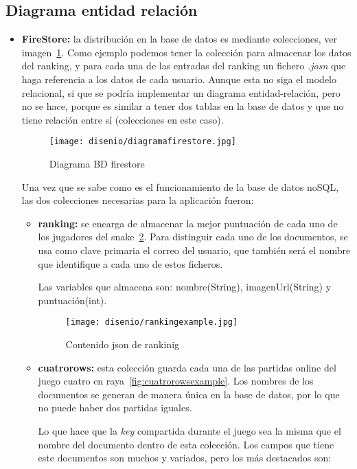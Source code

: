 \subsection{Diagrama entidad relación}
\begin{itemize}
	\item \textbf{FireStore:} la distribución en la base de datos es mediante colecciones, ver imagen~\ref{fig:diagramfirestore}. Como ejemplo podemos tener la colección para almacenar los datos del ranking, y para cada una de las entradas del ranking un fichero \emph{.josn} que haga referencia a los datos de cada usuario. Aunque esta no siga el modelo relacional, si que se podría implementar un diagrama entidad-relación, pero no se hace, porque es similar a tener dos tablas en la base de datos y que no tiene relación entre sí  (colecciones en este caso).
	
	\begin{figure}[H]
		\centering
		\texttt{[image: disenio/diagramafirestore.jpg]}
		\caption{Diagrama BD firestore}\label{fig:diagramfirestore}
	\end{figure}

	Una vez que se sabe como es el funcionamiento de la base de datos noSQL, las dos colecciones necesarias para la aplicación fueron:
	
	\begin{itemize}
		\item \textbf{ranking:} se encarga de almacenar la mejor puntuación de cada uno de los jugadores del snake~\ref{fig:rankingexample}. Para distinguir cada uno de los documentos, se usa como clave primaria el correo del usuario, que también será el nombre que identifique a cada uno de estos ficheros.
		
		Las variables que almacena son: nombre(String), imagenUrl(String) y puntuación(int). 
		
		\begin{figure}[H]
			\centering
			\texttt{[image: disenio/rankingexample.jpg]}
			\caption{Contenido json de rankinig}\label{fig:rankingexample}
		\end{figure}
	
		\item \textbf{cuatrorows:} esta colección guarda cada una de las partidas online del juego cuatro en raya~\ref{fig:cuatrorowsexample}. Los nombres de los documentos se generan de manera única en la base de datos, por lo que no puede haber dos partidas iguales.
		
		Lo que hace que la \emph{key} compartida durante el juego sea la misma que el nombre del documento dentro de esta colección. Los campos que tiene este documentos son muchos y variados, pero los más destacados son: 
		

\end{itemize}
\end{itemize}
